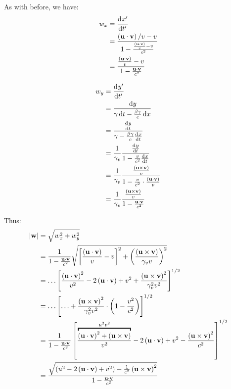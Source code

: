 \begin{parts}
	As with before, we have:
	\begin{align*}
		w_x &= \frac{\mathrm{d}^{}{x^\prime}}{\mathrm{d}{t^\prime}^{}} \\
		&= \frac{\left(\mathbf{u}\cdot\mathbf{v}\right)/v - v}{1-\frac{\frac{\left(\mathbf{u}\cdot\mathbf{v}\right)}{v} - v}{c^2}} \\
		&= \frac{\frac{\left(\mathbf{u}\cdot\mathbf{v}\right)}{v} - v}{1-\frac{\mathbf{u}\cdot\mathbf{v}}{c^2}}
	\end{align*}
	
	\begin{align*}
		w_y &= \frac{\mathrm{d}^{}{y^\prime}}{\mathrm{d}{t^\prime}^{}} \\
		&= \frac{\,\mathrm{d}{y}}{\gamma\,\mathrm{d}{t} - \frac{\beta\gamma}{c}\,\mathrm{d}{x}} \\
		&= \frac{\frac{\mathrm{d}^{}{y}}{\mathrm{d}{t}^{}}}{\gamma - \frac{\beta\gamma}{c}\frac{\mathrm{d}^{}{x}}{\mathrm{d}{t}^{}}} \\
		&= \frac{1}{\gamma_v} \frac{\frac{\mathrm{d}^{}{y}}{\mathrm{d}{t}^{}}}{1-\frac{v}{c^2} \frac{\mathrm{d}^{}{x}}{\mathrm{d}{t}^{}}} \\
		&= \frac{1}{\gamma_v} \frac{\frac{\left(\mathbf{u}\times\mathbf{v}\right)}{v}}{1-\frac{v}{c^2}\cdot\frac{\left(\mathbf{u}\cdot\mathbf{v}\right)}{v}} \\
		&= \frac{1}{\gamma_v} \frac{\frac{\left(\mathbf{u}\times\mathbf{v}\right)}{v}}{1-\frac{\mathbf{u}\cdot\mathbf{v}}{c^2}}
	\end{align*}
	
	Thus:
	\begin{align*}
		\abs{\mathbf{w}} &= \sqrt{w_x^2 + w_y^2} \\
		&= \frac{1}{1-\frac{\mathbf{u}\cdot\mathbf{v}}{c^2}} \sqrt{\sbracket{\frac{\rbracket{\mathbf{u}\cdot\mathbf{v}}}{v} - v}^2 + \rbracket{\frac{\rbracket{\mathbf{u}\times\mathbf{v}}}{\gamma_v v}}^2} \\
		&= \ldots \sbracket{\frac{\rbracket{\mathbf{u}\cdot\mathbf{v}}^2}{v^2} - 2\rbracket{\mathbf{u}\cdot\mathbf{v}} + v^2 + \frac{\rbracket{\mathbf{u}\times\mathbf{v}}^2}{\gamma_v^2 v^2}}^{1/2} \\
		&= \ldots \sbracket{\ldots + \frac{\rbracket{\mathbf{u}\times\mathbf{v}}^2}{\gamma_v^2 v^2} \cdot \rbracket{1-\frac{v^2}{c^2}}}^{1/2} \\
		&= \frac{1}{1-\frac{\mathbf{u}\cdot\mathbf{v}}{c^2}} \sbracket{\frac{\overbracket{\rbracket{\mathbf{u}\cdot\mathbf{v}}^2 + \rbracket{\mathbf{\mathbf{u}\times\mathbf{v}}}}^{u^2 v^2} }{v^2} - 2\rbracket{\mathbf{u}\cdot\mathbf{v}} + v^2 - \frac{\rbracket{\mathbf{u}\times\mathbf{v}}^2}{c^2}}^{1/2} \\
		&= \frac{\sqrt{\rbracket{u^2 - 2\rbracket{\mathbf{u}\cdot\mathbf{v}} + v^2} - \frac{1}{c^2}\rbracket{\mathbf{u}\times\mathbf{v}}^2}}{1-\frac{\mathbf{u}\cdot\mathbf{v}}{c^2}}
	\end{align*}
	

\end{parts}
